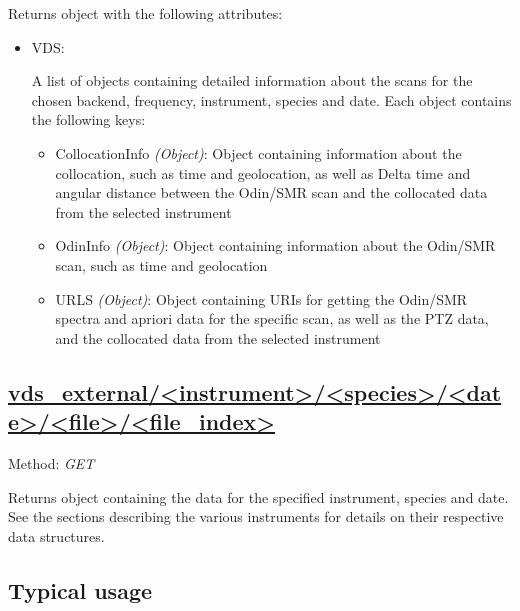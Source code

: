 Returns object with the following attributes:
\begin{itemize}
    \item VDS:

        A list of objects containing detailed information about the scans for
        the chosen backend, frequency, instrument, species and date.
        Each object contains the following keys:

        \begin{itemize}
            \item CollocationInfo \emph{(Object)}: Object containing
                information about the collocation, such as time and
                geolocation, as well as Delta time and angular distance between
                the Odin/SMR scan and the collocated data from the selected
                instrument
            \item OdinInfo \emph{(Object)}: Object containing information
                about the Odin/SMR scan, such as time and geolocation
            \item URLS \emph{(Object)}: Object containing URIs for getting the
            Odin/SMR spectra and apriori data for the specific scan, as
            well as the PTZ data, and the collocated data from the selected
            instrument
        \end{itemize}
\end{itemize}


\subsection{\url{vds_external/<instrument>/<species>/<date>/<file>/<file_index>}}
Method: \emph{GET}

Returns object containing the data for the specified instrument, species and
date. See the sections describing the various instruments for details on their
respective data structures.

\subsection{Typical usage}
\label{sec:api_usage}
